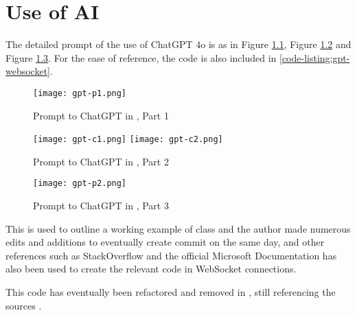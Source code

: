 \chapter{Use of AI}
The detailed prompt of the use of ChatGPT 4o \autocite{gpt-websocket} is as in Figure \ref{fig:gpt-websocket-1}, Figure \ref{fig:gpt-websocket-2} and Figure \ref{fig:gpt-websocket-3}. For the ease of reference, the code is also included in \ref{code-listing:gpt-websocket}.

\begin{figure}[htp]
    \centering

    \texttt{[image: gpt-p1.png]}
    \caption[Prompt to ChatGPT in \autocite{gpt-websocket}, Part 1]{Prompt to ChatGPT in \autocite{gpt-websocket}, Part 1}
    \label{fig:gpt-websocket-1}
\end{figure}

\begin{figure}[htp]
    \centering

    \texttt{[image: gpt-c1.png]}
    \texttt{[image: gpt-c2.png]}

    \caption[Prompt to ChatGPT in \autocite{gpt-websocket}, Part 2]{Prompt to ChatGPT in \autocite{gpt-websocket}, Part 2}
    \label{fig:gpt-websocket-2}
\end{figure}

\begin{figure}[htp]
    \centering

    \texttt{[image: gpt-p2.png]}

    \caption[Prompt to ChatGPT in \autocite{gpt-websocket}, Part 3]{Prompt to ChatGPT in \autocite{gpt-websocket}, Part 3}
    \label{fig:gpt-websocket-3}
\end{figure}

This is used to outline a working example of  class and the author made numerous edits and additions to eventually create commit  on the same day, and other references such as StackOverflow \autocite{stackoverflow-websocket-demo, stackoverflow-websocket-demo-2} and the official Microsoft Documentation \autocite{dotnet-reference-clientwebsocket} has also been used to create the relevant code in WebSocket connections.

This code has eventually been refactored and removed in , still referencing the sources \autocite{stackoverflow-websocket-demo, stackoverflow-websocket-demo-2}.